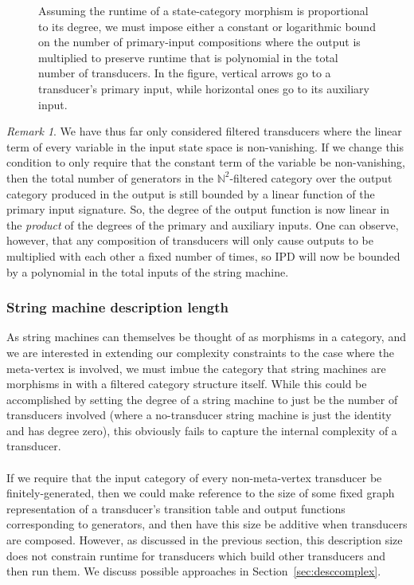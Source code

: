 \documentclass{article}
\theoremstyle{definition}
\theoremstyle{remark}
\newtheorem*{remark}{Remark}
\begin{document}
\begin{figure}[h]
    \centering
    \caption{Assuming the runtime of a state-category morphism is
    proportional to its degree, we must impose either a constant or
    logarithmic bound on the number of primary-input compositions where
    the output is multiplied to preserve runtime that is polynomial
    in the total number of transducers. In the figure, vertical
    arrows go to a transducer's primary input, while horizontal ones
    go to its auxiliary input.}
    \label{fig:boundedheightstacks}
\end{figure}

\begin{remark}
We have thus far only considered filtered transducers where the
linear term of every variable in the input state space is non-vanishing.
If we change this condition to only require that the constant term
of the variable be non-vanishing, then the total number of generators
in the $\mathbb{N}^2$-filtered category over the output category
produced in the output is still bounded by a linear function of the
primary input signature. So, the degree of the output function is now
linear in the \textit{product} of the degrees of the primary and
auxiliary inputs. One can observe, however, that any composition of
transducers will only cause outputs to be multiplied with each other
a fixed number of times, so $\mathrm{IPD}$ will now be bounded by
a polynomial in the total inputs of the string machine.
\end{remark}

\subsubsection{String machine description length}
As string machines can themselves be thought of
as morphisms in a category, and we are interested in extending
our complexity constraints to the case where the meta-vertex is
involved, we must imbue the category that string machines are
morphisms in with a filtered category structure itself. While this
could be accomplished by setting the degree of a string machine to just
be the number of transducers involved (where
a no-transducer string machine is just the identity and has degree
zero),
this obviously fails to capture the internal complexity of a transducer.
\\\\
If we require that the input category of every non-meta-vertex
transducer be finitely-generated, then we could make reference to the
size of some fixed graph representation of a transducer's transition
table and output functions corresponding to generators,
and then have this size be additive when transducers are composed.
However, as discussed in the previous section, this description
size does not constrain runtime for transducers which build other
transducers and then run them. We discuss possible approaches in
Section~\ref{sec:desccomplex}.
\end{document}
